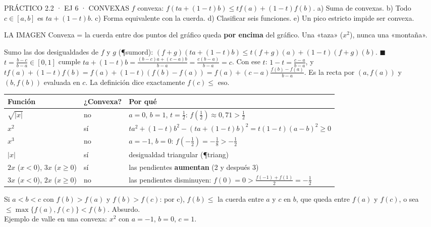 \begin{enunciado}{PRÁCTICO 2.2 · EJ 6 · CONVEXAS}
$f$ convexa: $f(ta+(1-t)b)\le tf(a)+(1-t)f(b)$. a) Suma de convexas. b) Todo $c\in[a,b]$ es $ta+(1-t)b$. c) Forma equivalente con la cuerda. d) Clasificar seis funciones. e) Un pico estricto impide ser convexa.
\end{enunciado}
\begin{tip}{LA IMAGEN}
Convexa = la cuerda entre dos puntos del gráfico queda \textbf{por encima} del gráfico. Una «taza» ($x^2$), nunca una «montaña».
\end{tip}
Sumo las dos desigualdades de $f$ y $g$ (\P{sumord}): $(f+g)(ta+(1-t)b)\le t(f+g)(a)+(1-t)(f+g)(b)$. $\blacksquare$
$t=\frac{b-c}{b-a}\in[0,1]$ cumple $ta+(1-t)b=\frac{(b-c)a+(c-a)b}{b-a}=\frac{c(b-a)}{b-a}=c$.
Con ese $t$: $1-t=\frac{c-a}{b-a}$, y $tf(a)+(1-t)f(b)=f(a)+(1-t)(f(b)-f(a))=f(a)+(c-a)\frac{f(b)-f(a)}{b-a}$. Es la recta por $(a,f(a))$ y $(b,f(b))$ evaluada en $c$. La definición dice exactamente $f(c)\le$ eso.
\begin{center}\small
\begin{tabularx}{\linewidth}{@{}l l X@{}}\toprule
Función & ¿Convexa? & Por qué\\\midrule
$\sqrt{|x|}$ & no & $a=0$, $b=1$, $t=\frac12$: $f(\frac12)\approx0{,}71>\frac12$\\
$x^2$ & sí & $t a^2+(1-t)b^2-(ta+(1-t)b)^2=t(1-t)(a-b)^2\ge0$\\
$x^3$ & no & $a=-1$, $b=0$: $f(-\frac12)=-\frac18>-\frac12$\\
$|x|$ & sí & desigualdad triangular (\P{triang})\\
$2x$ ($x<0$), $3x$ ($x\ge0$) & sí & las pendientes \textbf{aumentan} (2 y después 3)\\
$3x$ ($x<0$), $2x$ ($x\ge0$) & no & las pendientes disminuyen: $f(0)=0>\frac{f(-1)+f(1)}2=-\frac12$\\\bottomrule
\end{tabularx}
\end{center}
Si $a<b<c$ con $f(b)>f(a)$ y $f(b)>f(c)$: por c), $f(b)\le$ la cuerda entre $a$ y $c$ en $b$, que queda entre $f(a)$ y $f(c)$, o sea $\le\max\{f(a),f(c)\}<f(b)$. Absurdo.\\
Ejemplo de valle en una convexa: $x^2$ con $a=-1$, $b=0$, $c=1$.

